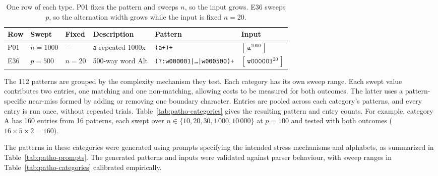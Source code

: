 \begin{table}[H]
\centering
\small
\begin{tabular*}{\textwidth}{@{\extracolsep{\fill}} llllll}
\hline
Row & Swept & Fixed & Description & Pattern & Input \\
\hline
P01 & $n = 1000$ & --- & \texttt{a} repeated 1000x
    & \texttt{(a+)+}
    & $[\,\texttt{a}^{1000}\,]$ \\
E36 & $p = 500$ & $n = 20$ & 500-way word Alt
    & \texttt{(?:w000001|\ldots|w000500)+}
    & $[\,\texttt{w000001}^{20}\,]$ \\
\hline
\end{tabular*}
\caption{One row of each type. P01 fixes the pattern and
sweeps $n$, so the input grows. E36 sweeps $p$, so the
alternation width grows while the input is fixed $n = 20$.}
\label{tab:sweep-samples}
\end{table}

The 112 patterns are grouped by the complexity mechanism they test. 
Each category has its own sweep range.
Each swept value contributes two entries, 
one matching and one non-matching,
allowing costs to be measured for both outcomes.
The latter uses a pattern-specific
near-miss formed by adding or removing one boundary character.
Entries are pooled across each category's patterns,
and every entry is run once, without repeated trials. 
Table~\ref{tab:patho-categories}
gives the resulting pattern and entry counts. 
For example, category A has 160 entries from 16 patterns, each swept
over $n \in \{10, 20, 30, 1\,000, 10\,000\}$ at $p=100$ and tested
with both outcomes ($16 \times 5 \times 2 = 160$).

The patterns in these categories were generated using
prompts specifying the intended stress
mechanisms and alphabets, as summarized in
Table~\ref{tab:patho-prompts}.
The generated patterns and inputs were validated against parser behaviour, 
with sweep ranges in Table~\ref{tab:patho-categories} calibrated empirically.

